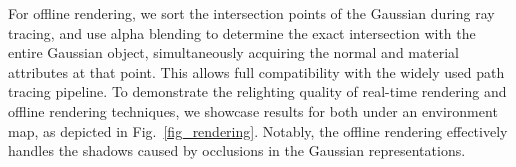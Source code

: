For offline rendering, we sort the intersection points of the Gaussian during ray tracing, and use alpha blending to determine the exact intersection with the entire Gaussian object, simultaneously acquiring the normal and material attributes at that point. This allows full compatibility with the widely used path tracing pipeline. To demonstrate the relighting quality of real-time rendering and offline rendering techniques, we showcase results for both under an environment map, as depicted in Fig.~\ref{fig_rendering}. Notably, the offline rendering effectively handles the shadows caused by occlusions in the Gaussian representations.






















































 






